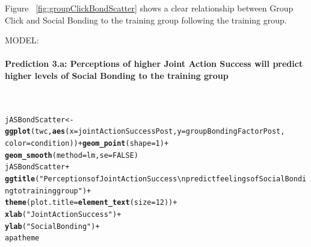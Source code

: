 \documentclass[english]{article}\usepackage[]{graphicx}\usepackage[]{color}
\makeatletter
\newcommand{\hlnum}[1]{\textcolor[rgb]{0.686,0.059,0.569}{#1}}%
\newcommand{\hlstr}[1]{\textcolor[rgb]{0.192,0.494,0.8}{#1}}%
\newcommand{\hlopt}[1]{\textcolor[rgb]{0,0,0}{#1}}%
\newcommand{\hlstd}[1]{\textcolor[rgb]{0.345,0.345,0.345}{#1}}%
\newcommand{\hlkwb}[1]{\textcolor[rgb]{0.69,0.353,0.396}{#1}}%
\newcommand{\hlkwc}[1]{\textcolor[rgb]{0.333,0.667,0.333}{#1}}%
\newcommand{\hlkwd}[1]{\textcolor[rgb]{0.737,0.353,0.396}{\textbf{#1}}}%
\newenvironment{kframe}{%
 \def\at@end@of@kframe{}%
 \ifinner\ifhmode%
  \def\at@end@of@kframe{\end{minipage}}%
  \begin{minipage}{\columnwidth}%
 \fi\fi%
 \def\FrameCommand##1{\hskip\@totalleftmargin \hskip-\fboxsep
 \colorbox{shadecolor}{##1}\hskip-\fboxsep
     \hskip-\linewidth \hskip-\@totalleftmargin \hskip\columnwidth}%
 \MakeFramed {\advance\hsize-\width
   \@totalleftmargin\z@ \linewidth\hsize
   \@setminipage}}%
 {\par\unskip\endMakeFramed%
 \at@end@of@kframe}
\newenvironment{knitrout}{}{} %
\newcommand{\myparagraph}[1]{\paragraph{#1}\mbox{}\\}
\makeatother
\begin{document}
Figure ~\ref{fig:groupClickBondScatter} shows a clear relationship between Group Click and Social Bonding to the training group following the training group.


MODEL:



\myparagraph{Prediction 3.a: Perceptions of higher Joint Action Success will predict higher levels of Social Bonding to the training group}


\begin{knitrout}
\color{fgcolor}\begin{kframe}
\begin{alltt}
\hlstd{jASBondScatter} \hlkwb{<-} \hlkwd{ggplot}\hlstd{(twc,} \hlkwd{aes}\hlstd{(}\hlkwc{x}\hlstd{=jointActionSuccessPost,} \hlkwc{y}\hlstd{=groupBondingFactorPost,}
                            \hlkwc{color}\hlstd{=condition))} \hlopt{+} \hlkwd{geom_point}\hlstd{(}\hlkwc{shape} \hlstd{=} \hlnum{1}\hlstd{)} \hlopt{+}
                            \hlkwd{geom_smooth}\hlstd{(}\hlkwc{method}\hlstd{=lm,} \hlkwc{se}\hlstd{=}\hlnum{FALSE}\hlstd{)}
\hlstd{jASBondScatter} \hlopt{+}
            \hlkwd{ggtitle}\hlstd{(}\hlstr{"Perceptions of Joint Action Success \textbackslash{}n predict feelings of Social Bonding to training group"}\hlstd{)} \hlopt{+}
            \hlkwd{theme}\hlstd{(}\hlkwc{plot.title} \hlstd{=} \hlkwd{element_text}\hlstd{(}\hlkwc{size}\hlstd{=}\hlnum{12}\hlstd{))} \hlopt{+}
            \hlkwd{xlab}\hlstd{(}\hlstr{"Joint Action Success"}\hlstd{)} \hlopt{+}
            \hlkwd{ylab}\hlstd{(}\hlstr{"Social Bonding"}\hlstd{)} \hlopt{+}
            \hlstd{apatheme}
\end{alltt}


{\ttfamily\noindent\color{warningcolor}{\#\# Warning: Removed 1 rows containing non-finite values (stat\_smooth).}}

{\ttfamily\noindent\color{warningcolor}{\#\# Warning: Removed 1 rows containing missing values (geom\_point).}}\end{kframe}\begin{figure}


\end{figure}
\end{knitrout}
\end{document}
